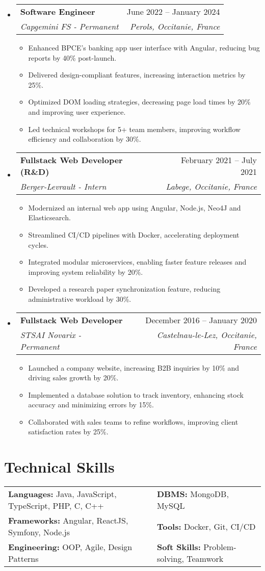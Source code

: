 \documentclass[letterpaper,11pt]{article}
\makeatletter
\newcommand{\resumeItem}[1]{\item\small{#1 \vspace{-2pt}}}
\newcommand{\resumeSubheading}[4]{
  \vspace{-2pt}\item
    \begin{tabular*}{0.97\textwidth}[t]{l@{\extracolsep{\fill}}r}
      \textbf{#1} & #2 \\
      \textit{\small#3} & \textit{\small #4} \\
    \end{tabular*}\vspace{-7pt}
}
\newcommand{\resumeSubHeadingListStart}{\begin{itemize}[leftmargin=0.15in, label={}]}
\newcommand{\resumeSubHeadingListEnd}{\end{itemize}}
\newcommand{\resumeItemListStart}{\begin{itemize}}
\newcommand{\resumeItemListEnd}{\end{itemize}\vspace{-5pt}}
\makeatother
\begin{document}
    \resumeSubHeadingListStart
    \resumeSubheading
      {Software Engineer}{June 2022 -- January 2024}
      {Capgemini FS - Permanent}{Perols, Occitanie, France}
    \resumeItemListStart
        \resumeItem{Enhanced BPCE’s banking app user interface with Angular, reducing bug reports by 40\% post-launch.}
        \resumeItem{Delivered design-compliant features, increasing interaction metrics by 25\%.}
        \resumeItem{Optimized DOM loading strategies, decreasing page load times by 20\% and improving user experience.}
        \resumeItem{Led technical workshops for 5+ team members, improving workflow efficiency and collaboration by 30\%.}
    \resumeItemListEnd
  \resumeSubHeadingListEnd

      \resumeSubHeadingListStart
    \resumeSubheading
      {Fullstack Web Developer (R\&D)}{February 2021 -- July 2021}
      {Berger-Levrault - Intern}{Labege, Occitanie, France}
    \resumeItemListStart
        \resumeItem{Modernized an internal web app using Angular, Node.js, Neo4J and Elasticsearch.}
        \resumeItem{Streamlined CI/CD pipelines with Docker, accelerating deployment cycles.}
        \resumeItem{Integrated modular microservices, enabling faster feature releases and improving system reliability by 20\%.}
        \resumeItem{Developed a research paper synchronization feature, reducing administrative workload by 30\%.}
    \resumeItemListEnd
  \resumeSubHeadingListEnd

      \resumeSubHeadingListStart
    \resumeSubheading
      {Fullstack Web Developer}{December 2016 -- January 2020}
      {STSAI Novarix - Permanent}{Castelnau-le-Lez, Occitanie, France}
    \resumeItemListStart
        \resumeItem{Launched a company website, increasing B2B inquiries by 10\% and driving sales growth by 20\%.}
        \resumeItem{Implemented a database solution to track inventory, enhancing stock accuracy and minimizing errors by 15\%.}
        \resumeItem{Collaborated with sales teams to refine workflows, improving client satisfaction rates by 25\%.}
    \resumeItemListEnd
  \resumeSubHeadingListEnd

\section{Technical Skills}
\small{
\begin{tabularx}{\textwidth} {X X}
\textbf{Languages:} Java, JavaScript, TypeScript, PHP, C, C++ & \textbf{DBMS:} MongoDB, MySQL \\
\textbf{Frameworks:} Angular, ReactJS, Symfony, Node.js & \textbf{Tools:} Docker, Git, CI/CD \\
\textbf{Engineering:} OOP, Agile, Design Patterns & \textbf{Soft Skills:} Problem-solving, Teamwork \\
\end{tabularx}
}
\end{document}
